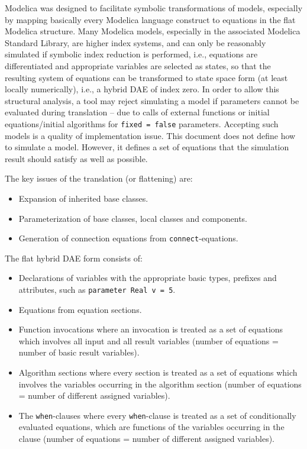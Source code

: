 Modelica was designed to facilitate symbolic transformations of models, especially by mapping basically every Modelica language construct to equations in the flat Modelica structure.
Many Modelica models, especially in the associated Modelica Standard Library, are higher index systems, and can only be reasonably simulated if symbolic index reduction is performed, i.e., equations are differentiated and appropriate variables are selected as states, so that the resulting system of equations can be transformed to state space form (at least locally numerically), i.e., a hybrid DAE of index zero.
In order to allow this structural analysis, a tool may reject simulating a model if parameters cannot be evaluated during translation -- due to calls of external functions or initial equations/initial algorithms for \lstinline!fixed = false! parameters.
Accepting such models is a quality of implementation issue.
This document does not define how to simulate a model.
However, it defines a set of equations that the simulation result should satisfy as well as possible.

The key issues of the translation (or flattening) are:
\begin{itemize}
\item
  Expansion of inherited base classes.
\item
  Parameterization of base classes, local classes and components.
\item
  Generation of connection equations from \lstinline!connect!-equations.
\end{itemize}

The flat hybrid DAE form consists of:
\begin{itemize}
\item
  Declarations of variables with the appropriate basic types, prefixes and attributes, such as \lstinline!parameter Real v = 5!.
\item
  Equations from equation sections.
\item
  Function invocations where an invocation is treated as a set of equations which involves all input and all result variables (number of equations = number of basic result variables).
\item
  Algorithm sections where every section is treated as a set of equations which involves the variables occurring in the algorithm section (number of equations = number of different assigned variables).
\item
  The \lstinline!when!-clauses where every \lstinline!when!-clause is treated as a set of conditionally evaluated equations, which are functions of the variables occurring in the clause (number of equations = number of different assigned variables).
\end{itemize}

